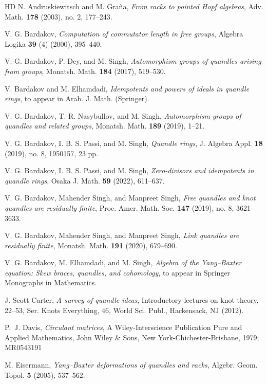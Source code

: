 \documentclass[12 pt]{amsart}
\theoremstyle{definition}
\theoremstyle{remark}
\numberwithin{equation}{section}
\begin{document}
\begin{thebibliography}{HD}
  N. Andruskiewitsch and M. Gra\~{n}a,  \textit{From racks to pointed Hopf algebras}, Adv. Math. {\bf 178} (2003), no. 2, 177--243.

 V. G. Bardakov, \textit{Computation of commutator length in free groups}, Algebra Logika {\bf 39} (4) (2000),  395--440.

 V. G. Bardakov, P. Dey, and M. Singh, \textit{Automorphism groups of quandles arising from groups},  Monatsh. Math. {\bf 184} (2017), 519--530.

 V. Bardakov and M. Elhamdadi, \textit{Idempotents and powers of ideals in quandle rings}, to appear in Arab. J. Math. (Springer).

 V. G. Bardakov, T. R. Nasybullov, and M. Singh, \textit{Automorphism groups of quandles and related groups},  Monatsh. Math.  {\bf 189} (2019), 1--21.

 V. G. Bardakov, I. B. S. Passi, and M. Singh, \textit{Quandle rings},  J. Algebra Appl. {\bf 18} (2019), no. 8, 1950157, 23 pp.

 V. G. Bardakov, I. B. S. Passi, and M. Singh, \textit{Zero-divisors and idempotents in quandle rings}, Osaka J. Math. {\bf 59} (2022),
611--637.

 V. G. Bardakov, Mahender Singh, and Manpreet Singh, \textit{Free quandles and knot quandles are residually finite}, Proc. Amer. Math. Soc. {\bf 147} (2019), no. 8, 3621--3633.

 V. G. Bardakov, Mahender Singh, and Manpreet Singh, \textit{Link quandles are residually finite},  Monatsh. Math. {\bf 191} (2020), 679--690.


 V. G. Bardakov, M. Elhamdadi, and M. Singh, \textit{Algebra of the Yang--Baxter equation: Skew braces, quandles, and cohomology}, to appear in Springer Monographs in Mathematics.
	
 J. Scott Carter, \textit{A survey of quandle ideas}, Introductory lectures on knot theory, 22--53, Ser. Knots Everything, 46, World Sci. Publ., Hackensack, NJ (2012).

 P.~J. Davis, {\it Circulant matrices}, A Wiley-Interscience Publication Pure and Applied Mathematics, John Wiley \& Sons, New York-Chichester-Brisbane, 1979; MR0543191

 M. Eisermann, \textit{Yang--Baxter deformations of quandles and racks}, Algebr. Geom. Topol. {\bf 5} (2005), 537--562.


\end{thebibliography}
\end{document}
